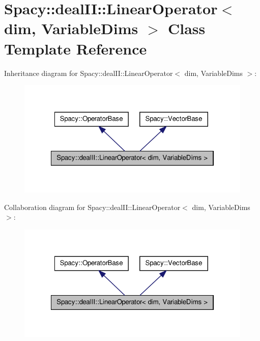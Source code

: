 \hypertarget{classSpacy_1_1dealII_1_1LinearOperator}{\section{\-Spacy\-:\-:deal\-I\-I\-:\-:\-Linear\-Operator$<$ dim, \-Variable\-Dims $>$ \-Class \-Template \-Reference}
\label{classSpacy_1_1dealII_1_1LinearOperator}
}


\-Inheritance diagram for \-Spacy\-:\-:deal\-I\-I\-:\-:\-Linear\-Operator$<$ dim, \-Variable\-Dims $>$\-:
\nopagebreak
\begin{figure}[H]
\begin{center}
\leavevmode
\includegraphics[width=322pt]{classSpacy_1_1dealII_1_1LinearOperator__inherit__graph}
\end{center}
\end{figure}


\-Collaboration diagram for \-Spacy\-:\-:deal\-I\-I\-:\-:\-Linear\-Operator$<$ dim, \-Variable\-Dims $>$\-:
\nopagebreak
\begin{figure}[H]
\begin{center}
\leavevmode
\includegraphics[width=322pt]{classSpacy_1_1dealII_1_1LinearOperator__coll__graph}
\end{center}
\end{figure}
